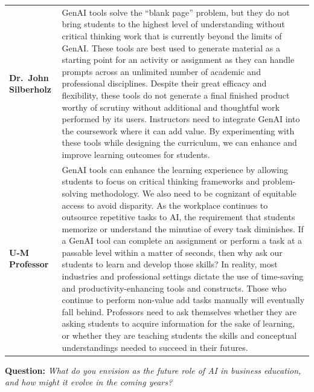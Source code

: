 \documentclass[
]{book}
\begin{document}
\begin{longtable}[]{@{}
  >{\raggedright\arraybackslash}p{}
  >{\raggedright\arraybackslash}p{}@{}}
\textbf{Dr.~John Silberholz} & GenAI tools solve the ``blank page'' problem, but they do not bring students to the highest level of understanding without critical thinking work that is currently beyond the limits of GenAI. These tools are best used to generate material as a starting point for an activity or assignment as they can handle prompts across an unlimited number of academic and professional disciplines. Despite their great efficacy and flexibility, these tools do not generate a final finished product worthy of scrutiny without additional and thoughtful work performed by its users. Instructors need to integrate GenAI into the coursework where it can add value. By experimenting with these tools while designing the curriculum, we can enhance and improve learning outcomes for students. \\
\textbf{U-M Professor} & GenAI tools can enhance the learning experience by allowing students to focus on critical thinking frameworks and problem-solving methodology. We also need to be cognizant of equitable access to avoid disparity. As the workplace continues to outsource repetitive tasks to AI, the requirement that students memorize or understand the minutiae of every task diminishes. If a GenAI tool can complete an assignment or perform a task at a passable level within a matter of seconds, then why ask our students to learn and develop those skills? In reality, most industries and professional settings dictate the use of time-saving and productivity-enhancing tools and constructs. Those who continue to perform non-value add tasks manually will eventually fall behind. Professors need to ask themselves whether they are asking students to acquire information for the sake of learning, or whether they are teaching students the skills and conceptual understandings needed to succeed in their futures. \\
\end{longtable}

\textbf{Question:} \emph{What do you envision as the future role of AI in business education, and how might it evolve in the coming years?}
\end{document}
